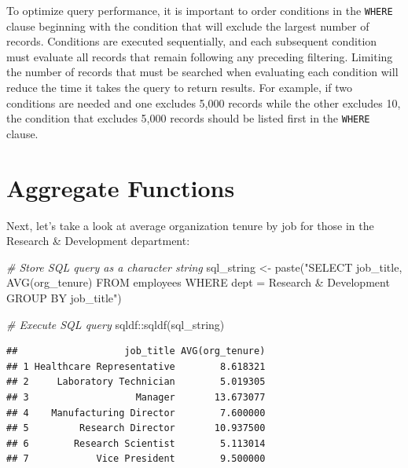 \documentclass[
]{book}
\newenvironment{Shaded}{\begin{snugshade}}{\end{snugshade}}
\newcommand{\CommentTok}[1]{\textcolor[rgb]{0.56,0.35,0.01}{\textit{#1}}}
\newcommand{\FunctionTok}[1]{\textcolor[rgb]{0.00,0.00,0.00}{#1}}
\newcommand{\NormalTok}[1]{#1}
\newcommand{\OtherTok}[1]{\textcolor[rgb]{0.56,0.35,0.01}{#1}}
\newcommand{\SpecialCharTok}[1]{\textcolor[rgb]{0.00,0.00,0.00}{#1}}
\newcommand{\StringTok}[1]{\textcolor[rgb]{0.31,0.60,0.02}{#1}}
\begin{document}
To optimize query performance, it is important to order conditions in the \texttt{WHERE} clause beginning with the condition that will exclude the largest number of records. Conditions are executed sequentially, and each subsequent condition must evaluate all records that remain following any preceding filtering. Limiting the number of records that must be searched when evaluating each condition will reduce the time it takes the query to return results. For example, if two conditions are needed and one excludes 5,000 records while the other excludes 10, the condition that excludes 5,000 records should be listed first in the \texttt{WHERE} clause.

\hypertarget{aggregate-functions}{%
\section{Aggregate Functions}\label{aggregate-functions}}

Next, let's take a look at average organization tenure by job for those in the Research \& Development department:

\begin{Shaded}
\begin{Highlighting}[]
\CommentTok{\# Store SQL query as a character string}
\NormalTok{sql\_string }\OtherTok{\textless{}{-}} \FunctionTok{paste}\NormalTok{(}\StringTok{"SELECT}
\StringTok{                      job\_title,}
\StringTok{                      AVG(org\_tenure)}
\StringTok{                    FROM}
\StringTok{                      employees}
\StringTok{                    WHERE}
\StringTok{                      dept = \textquotesingle{}Research \& Development\textquotesingle{}}
\StringTok{                    GROUP BY}
\StringTok{                      job\_title"}\NormalTok{)}

\CommentTok{\# Execute SQL query}
\NormalTok{sqldf}\SpecialCharTok{::}\FunctionTok{sqldf}\NormalTok{(sql\_string)}
\end{Highlighting}
\end{Shaded}

\begin{verbatim}
##                   job_title AVG(org_tenure)
## 1 Healthcare Representative        8.618321
## 2     Laboratory Technician        5.019305
## 3                   Manager       13.673077
## 4    Manufacturing Director        7.600000
## 5         Research Director       10.937500
## 6        Research Scientist        5.113014
## 7            Vice President        9.500000
\end{verbatim}
\end{document}

